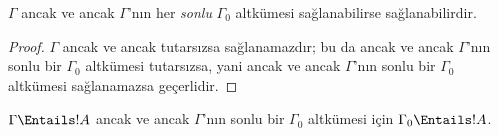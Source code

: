 \begin{prop}
$\Gamma$ ancak ve ancak $\Gamma$'nın her \emph{sonlu} $\Gamma_0$ altkümesi
sağlanabilirse sağlanabilirdir.
\end{prop}

\begin{proof}
$\Gamma$ ancak ve ancak tutarsızsa sağlanamazdır; bu da ancak ve ancak
$\Gamma$'nın sonlu bir $\Gamma_0$ altkümesi tutarsızsa, yani ancak ve ancak
$\Gamma$'nın sonlu bir $\Gamma_0$ altkümesi sağlanamazsa geçerlidir.
\end{proof}

\begin{cor}
$\Gamma \Entails !A$ ancak ve ancak $\Gamma$'nın sonlu bir $\Gamma_0$
altkümesi için $\Gamma_0 \Entails !A$.
\end{cor}

